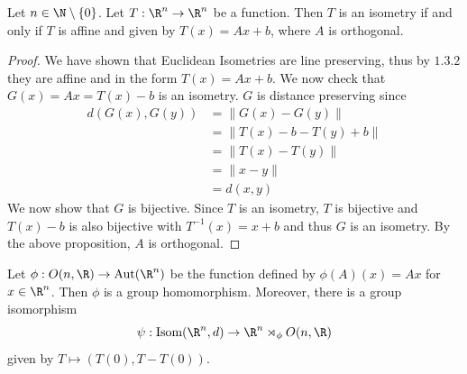 \documentclass[a4paper]{article}
\begin{document}
\begin{prp}{}{} Let $n\in\N\setminus\{0\}$. Let $T:\R^n\to\R^n$ be a function. Then $T$ is an isometry if and only if $T$ is affine and given by $T(x)=Ax+b$, where $A$ is orthogonal. 
\begin{proof} We have shown that Euclidean Isometries are line preserving, thus by $1.3.2$ they are affine and in the form $T(x)=Ax+b$. We now check that $G(x)=Ax=T(x)-b$ is an isometry. $G$ is distance preserving since
\begin{align*}
d(G(x),G(y))&=\|G(x)-G(y)\|\\
&=\|T(x)-b-T(y)+b\|\\
&=\|T(x)-T(y)\|\\
&=\|x-y\|\tag{$T$ is an isometry}\\
&=d(x,y)
\end{align*}
We now show that $G$ is bijective. Since $T$ is an isometry, $T$ is bijective and $T(x)-b$ is also bijective with $T^{-1}(x)=x+b$ and thus $G$ is an isometry. By the above proposition, $A$ is orthogonal. 
\end{proof}
\end{prp}

\begin{prp}{}{} Let $\phi:O(n,\R)\to\text{Aut}(\R^n)$ be the function defined by $\phi(A)(x)=Ax$ for $x\in\R^n$. Then $\phi$ is a group homomorphism. Moreover, there is a group isomorphism $$\psi:\text{Isom}(\R^n,d)\to \R^n\rtimes_\phi O(n,\R)$$ given by $T\mapsto(T(0),T-T(0))$. 
\end{prp}
\end{document}
